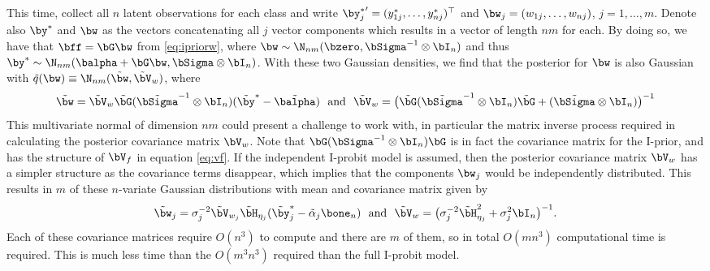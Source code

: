 This time, collect all $n$ latent observations for each class and write ${\by_j^*}' = (y_{1j}^*,\dots,y_{nj}^*)^\top$ and $\bw_j = (w_{1j},\dots,w_{nj})$, $j=1,\dots,m$.
Denote also $\by^*$ and $\bw$ as the vectors concatenating all $j$ vector components which results in a vector of length $nm$ for each.
By doing so, we have that $\bff = \bG\bw$ from \eqref{eq:ipriorw}, where $\bw \sim \N_{nm}(\bzero, \bSigma^{-1} \otimes \bI_n)$ and thus $\by^* \sim \N_{nm}(\balpha + \bG\bw, \bSigma \otimes \bI_n)$.
With these two Gaussian densities, we find that the posterior for $\bw$ is also Gaussian with $\tilde q(\bw) \equiv \N_{nm}(\tilde \bw, \tilde\bV_w)$, where
\[
  \tilde \bw = \tilde \bV_w\tilde\bG (\tilde\bSigma^{-1} \otimes \bI_n) (\tilde\by^* - \tilde\balpha) \ \text{ and } \ \tilde \bV_w = \big(\tilde\bG(\tilde\bSigma^{-1} \otimes \bI_n)\tilde\bG + (\tilde\bSigma \otimes \bI_n) \big)^{-1}
\]
This multivariate normal of dimension $nm$ could present a challenge to work with, in particular the matrix inverse process required in calculating the posterior covariance matrix $\bV_w$.
Note that $\bG(\bSigma^{-1} \otimes \bI_n)\bG$ is in fact the covariance matrix for the I-prior, and has the structure of $\bV_f$ in equation \eqref{eq:vf}.
If the independent I-probit model is assumed, then the posterior covariance matrix $\bV_w$ has a simpler structure as the covariance terms disappear, which implies that the components $\bw_j$ would be independently distributed. 
This results in $m$ of these $n$-variate Gaussian distributions with mean and covariance matrix given by
\[
  \tilde \bw_j = \sigma_j^{-2}\tilde \bV_{w_j}\tilde\bH_{\eta_j} (\tilde\by^*_j - \tilde\alpha_j\bone_n) \ \text{ and } \ \tilde \bV_w = \big(\sigma_j^{-2}\tilde\bH_{\eta_j}^2 + \sigma_j^{2}\bI_n \big)^{-1}.
\]
Each of these covariance matrices require $O(n^3)$ to compute and there are $m$ of them, so in total $O(mn^3)$ computational time is required.
This is much less time than the $O(m^3n^3)$ required than the full I-probit model.

